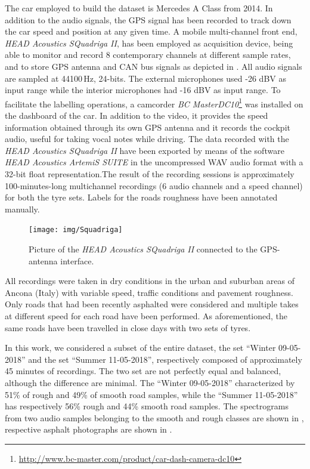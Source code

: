The car employed to build the dataset is Mercedes A Class from 2014. In addition to the audio signals, the GPS signal has been recorded to track down the car speed and position at any given time. A mobile multi-channel front end, \textit{HEAD Acoustics SQuadriga II}, has been employed as acquisition device, being able to monitor and record 8 contemporary channels at different sample rates, and to store GPS antenna and CAN bus signals as depicted in .
All audio signals are sampled at 44100\,Hz, 24-bits. The external microphones used -26 dBV as input range while the interior microphones had -16 dBV as input range. To facilitate the labelling operations, a camcorder \textit{BC MasterDC10}\footnote{\url{http://www.bc-master.com/product/car-dash-camera-dc10}} was installed on the dashboard of the car. In addition to the video, it provides the speed information obtained through its own GPS antenna and it records the cockpit audio, useful for taking vocal notes while driving. The data recorded with the \textit{HEAD Acoustics SQuadriga II} have been exported by means of the software \textit{HEAD Acoustics ArtemiS SUITE} in the uncompressed WAV audio format with a 32-bit float representation.The result of the recording sessions is approximately 100-minutes-long multichannel recordings (6 audio channels and a speed channel) for both the tyre sets. Labels for the roads roughness have been annotated manually. 

\begin{figure}[h]
	\centering
	\texttt{[image: img/Squadriga]}
	\caption[HEAD Acoustics SQuadriga II]{Picture of the \textit{HEAD Acoustics SQuadriga II} connected to the GPS-antenna interface.}
	\label{fig:car-Squadriga}
\end{figure}

All recordings were taken in dry conditions in the urban and suburban areas of Ancona (Italy) with variable speed, traffic conditions and pavement roughness. Only roads that had been recently asphalted were considered and multiple takes at different speed for each road have been performed. As aforementioned, the same roads have been travelled in close days with two sets of tyres.

In this work, we considered a subset of the entire dataset, the set ``Winter 09-05-2018'' and the set ``Summer 11-05-2018'', respectively composed of approximately 45 minutes of recordings.
The two set are not perfectly equal and balanced, although the difference are minimal. The ``Winter 09-05-2018'' characterized by 51\% of rough and 49\% of smooth road samples, while the ``Summer 11-05-2018'' has respectively 56\% rough and 44\% smooth road samples. 
The spectrograms from two audio samples belonging to the smooth and rough classes are shown in , respective asphalt photographs are shown in .

